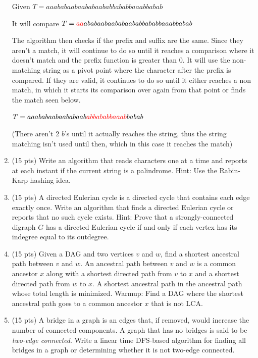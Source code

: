 \documentclass{article}
\begin{document}
\begin{enumerate}
\begin{itemize}
\end{itemize}

Given $T=aaababaabaababaababbababbaaabbabab$

It will compare $T=\textcolor{red}{aa}ababaabaababaababbababbaaabbabab$

The algorithm then checks if the prefix and suffix are the same. Since they aren't a match, it will continue to do so until it reaches a comparison where it doesn't match and the prefix function is greater than 0. It will use the non-matching string as a pivot point where the character after the prefix is compared. If they are valid, it continues to do so until it either reaches a non match, in which it starts its comparison over again from that point or finds the match seen below.

$T=aaababaabaababaab\textcolor{red}{abbababbaaab}babab$

(There aren't 2 $b$'s until it actually reaches the string, thus the string matching isn't used until then, which in this case it reaches the match)
\newpage


\item (15 pts) Write an algorithm that reads characters one at a time and reports at each instant if the current string is a palindrome. Hint: Use the Rabin-Karp hashing idea.

\newpage

\item (15 pts) A directed Eulerian cycle is a directed cycle that contains each edge exactly once. Write an algorithm that finds a directed Eulerian cycle or reports that no such cycle exists. Hint: Prove that a strongly-connected digraph $G$ has a directed Eulerian cycle if and only if each vertex has its indegree equal to its outdegree.

\newpage

\item (15 pts) Given a DAG and two vertices $v$ and $w$, find a shortest ancestral path between $v$ and $w$. An ancestral path between $v$ and $w$ is a common ancestor $x$ along with a shortest directed path from $v$ to $x$ and a shortest directed path from $w$ to $x$. A shortest ancestral path in the ancestral path whose total length is minimized. Warmup: Find a DAG where the shortest ancestral path goes to a common ancestor $x$ that is not LCA. 

\newpage

\item (15 pts) A bridge in a graph is an edges that, if removed, would increase the number of connected components. A graph that has no bridges is said to be {\em two-edge connected}. Write a linear time DFS-based algorithm for finding all bridges in a graph or determining whether it is not two-edge connected.


\end{enumerate}
\end{document}
